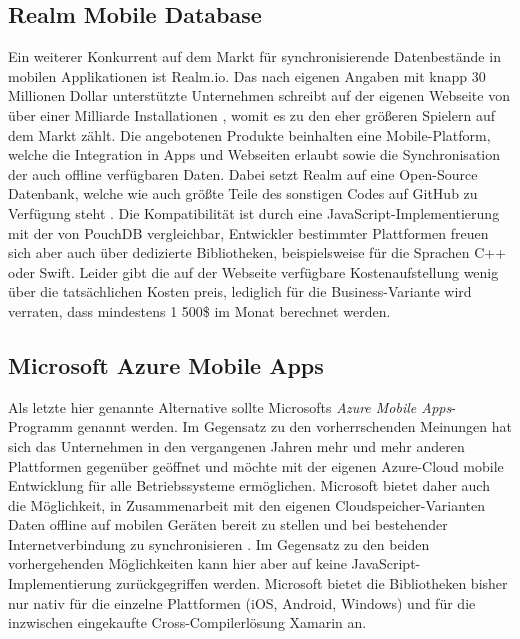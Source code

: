 \subsection{Realm Mobile Database}
Ein weiterer Konkurrent auf dem Markt für synchronisierende Datenbestände in mobilen Applikationen ist Realm.io. Das nach eigenen Angaben mit knapp 30 Millionen Dollar unterstützte Unternehmen schreibt auf der eigenen Webseite von über einer Milliarde Installationen \cite{realm:about}, womit es zu den eher größeren Spielern auf dem Markt zählt. Die angebotenen Produkte beinhalten eine Mobile-Platform, welche die Integration in Apps und Webseiten erlaubt sowie die Synchronisation der auch offline verfügbaren Daten. Dabei setzt Realm auf eine Open-Source Datenbank, welche wie auch größte Teile des sonstigen Codes auf GitHub zu Verfügung steht \cite{realm:githubrepo}. Die Kompatibilität ist durch eine JavaScript-Implementierung mit der von PouchDB vergleichbar, Entwickler bestimmter Plattformen freuen sich aber auch über dedizierte Bibliotheken, beispielsweise für die Sprachen C++ oder Swift. Leider gibt die auf der Webseite verfügbare Kostenaufstellung wenig über die tatsächlichen Kosten preis, lediglich für die Business-Variante wird verraten, dass mindestens 1 500\$ im Monat berechnet werden.

\subsection{Microsoft Azure Mobile Apps}
Als letzte hier genannte Alternative sollte Microsofts \emph{Azure Mobile Apps}-Programm genannt werden. Im Gegensatz zu den vorherrschenden Meinungen hat sich das Unternehmen in den vergangenen Jahren mehr und mehr anderen Plattformen gegenüber geöffnet und möchte mit der eigenen Azure-Cloud mobile Entwicklung für alle Betriebssysteme ermöglichen.
Microsoft bietet daher auch die Möglichkeit, in Zusammenarbeit mit den eigenen Cloudspeicher-Varianten Daten offline auf mobilen Geräten bereit zu stellen und bei bestehender Internetverbindung zu synchronisieren \cite{microsoft:azuremobileappssync}. Im Gegensatz zu den beiden vorhergehenden Möglichkeiten kann hier aber auf keine JavaScript-Implementierung zurückgegriffen werden. Microsoft bietet die Bibliotheken bisher nur nativ für die einzelne Plattformen (iOS, Android, Windows) und für die inzwischen eingekaufte Cross-Compilerlösung Xamarin an.
